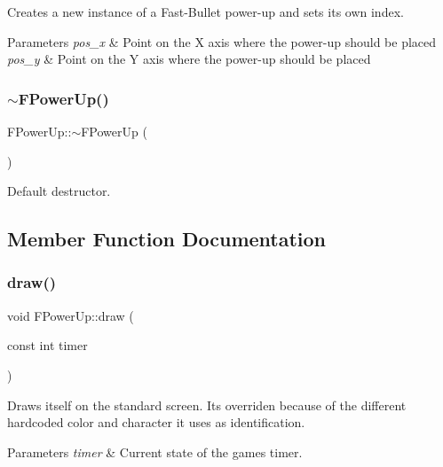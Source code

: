 Creates a new instance of a Fast-\/\+Bullet power-\/up and sets it\textquotesingle{}s own index.


\begin{DoxyParams}{Parameters}
{\em pos\+\_\+x} & Point on the X axis where the power-\/up should be placed \\
\hline
{\em pos\+\_\+y} & Point on the Y axis where the power-\/up should be placed \\
\hline
\end{DoxyParams}
\mbox{\label{classFPowerUp_aa062fd6a8f23d57dcb4e282583f3bfc8}} 
\subsubsection{\texorpdfstring{$\sim$\+F\+Power\+Up()}{~FPowerUp()}}
{\footnotesize\ttfamily F\+Power\+Up\+::$\sim$\+F\+Power\+Up (\begin{DoxyParamCaption}{ }\end{DoxyParamCaption})}



Default destructor. 



\subsection{Member Function Documentation}
\mbox{\label{classFPowerUp_aaf83782b032f53dacd37650127595148}} 
\subsubsection{\texorpdfstring{draw()}{draw()}}
{\footnotesize\ttfamily void F\+Power\+Up\+::draw (\begin{DoxyParamCaption}\item[{const int}]{timer }\end{DoxyParamCaption})\hspace{0.3cm}{\ttfamily [virtual]}}

Draws itself on the standard screen. It\textquotesingle{}s overriden because of the different hardcoded color and character it uses as identification.


\begin{DoxyParams}{Parameters}
{\em timer} & Current state of the game\textquotesingle{}s timer. \\
\hline
\end{DoxyParams}


